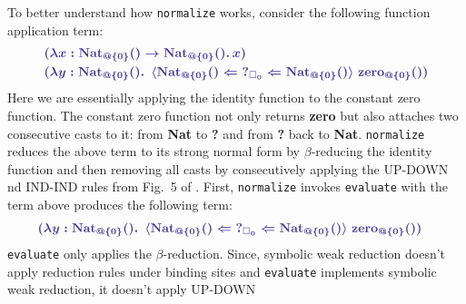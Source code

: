 \documentclass{article}
\theoremstyle{definition}
\newcommand{\Ccode}[1]{{\color{BlueViolet}\textbf{#1}}}
\newcommand{\Ccmath}[1]{{\color{BlueViolet}\boldsymbol{#1}}}
\newcommand{\CastTwo}[4]{
  \(\Ccmath{\langle}\)#1~\(\Ccmath{\Leftarrow}\)~#2~\(\Ccmath{\Leftarrow}\)~#3\(\Ccmath{\rangle}\)~#4}
\begin{document}
To better understand how \texttt{normalize} works, consider the following
function application term:
\[
\begin{aligned}
  &\Ccmath{(\lambda x : \text{\Ccode{Nat}}_{@\{0\}}() \to \text{\Ccode{Nat}}_{@\{0\}}() .\, x)}\\
  &\Ccmath{(\lambda y : \text{\Ccode{Nat}}_{@\{0\}}() .\,
    \text{\CastTwo{\Ccode{Nat}\(_{@\{0\}}\)\Ccode{()}}
      {\(?_{\square_0}\)}
      {\Ccode{Nat}\(_{@\{0\}}\)\Ccode{()}}
      {\Ccode{zero}\(_{@\{0\}}\)\Ccode{()}}})}
\end{aligned}
\]
Here we are essentially applying the identity function to the constant zero
function. The constant zero function not only returns \Ccode{zero} but also
attaches two consecutive casts to it: from \Ccode{Nat} to \Ccode{?} and from
\Ccode{?} back to \Ccode{Nat}. \texttt{normalize} reduces the above term to its
strong normal form by \(\beta\)-reducing the identity function and then removing
all casts by consecutively applying the UP-DOWN nd IND-IND rules from Fig.~5 of
\citet{lennon-bertrand_gradualizing_2022}. First, \texttt{normalize} invokes
\texttt{evaluate} with the term above produces the following term:
\[
\begin{aligned}
  &\Ccmath{(\lambda y : \text{\Ccode{Nat}}_{@\{0\}}() .\,
    \text{\CastTwo{\Ccode{Nat}\(_{@\{0\}}\)\Ccode{()}}
      {\(?_{\square_0}\)}
      {\Ccode{Nat}\(_{@\{0\}}\)\Ccode{()}}
      {\Ccode{zero}\(_{@\{0\}}\)\Ccode{()}}})}
\end{aligned}
\]
\texttt{evaluate} only applies the \(\beta\)-reduction. Since, symbolic weak
reduction doesn't apply reduction rules under binding sites and
\texttt{evaluate} implements symbolic weak reduction, it doesn't apply UP-DOWN
\end{document}
